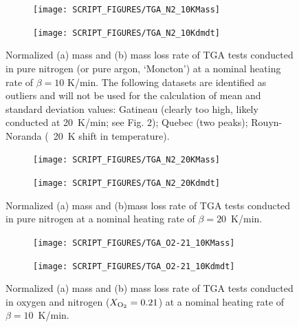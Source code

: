 \documentclass{book}
\begin{document}
\begin{figure} [p]
\centering
\begin{subfigure}[b]{0.85\textwidth}
   \texttt{[image: SCRIPT\_FIGURES/TGA\_N2\_10KMass]}
   \caption{}
   \label{Fig:TGA_N2_10KMass}
\end{subfigure}

\begin{subfigure}[b]{0.85\textwidth}
   \texttt{[image: SCRIPT\_FIGURES/TGA\_N2\_10Kdmdt]}
   \caption{}
   \label{Fig:TGA_N2_10Kdmdt}
\end{subfigure}

  \caption{Normalized (a) mass and (b) mass loss rate of TGA tests conducted in pure nitrogen (or pure argon, ‘Moncton’) at a nominal heating rate of $\beta = 10$ K/min. The following datasets are identified as outliers and will not be used for the calculation of mean and standard deviation values: Gatineau (clearly too high, likely conducted at 20~K/min; see Fig. 2); Quebec (two peaks); Rouyn-Noranda (~20~K shift in temperature).}
  \label{Fig:TGA_N2_10K}
\end{figure}

\begin{figure}[p]
\centering
\begin{subfigure}[b]{0.85\textwidth}
   \texttt{[image: SCRIPT\_FIGURES/TGA\_N2\_20KMass]}
   \caption{}
   \label{Fig:TGA_N2_20KMass}
\end{subfigure}

\begin{subfigure}[b]{0.85\textwidth}
   \texttt{[image: SCRIPT\_FIGURES/TGA\_N2\_20Kdmdt]}
   \caption{}
   \label{Fig:TGA_N2_20Kdmdt}
\end{subfigure}

  \caption{Normalized (a) mass and (b)mass loss rate of TGA tests conducted in pure nitrogen at a nominal heating rate of $\beta=20$~K/min.}
  \label{Fig:TGA_N2_20K}
\end{figure}


\begin{figure}
\centering
\begin{subfigure}[b]{0.85\textwidth}
   \texttt{[image: SCRIPT\_FIGURES/TGA\_O2-21\_10KMass]}
   \caption{}
   \label{Fig:TGA_O2-21_10KMass}
\end{subfigure}

\begin{subfigure}[b]{0.85\textwidth}
   \texttt{[image: SCRIPT\_FIGURES/TGA\_O2-21\_10Kdmdt]}
   \caption{}
   \label{Fig:TGA_O2-21_10Kdmdt}
\end{subfigure}

  \caption{Normalized (a) mass and (b) mass loss rate of TGA tests conducted in oxygen and nitrogen ($X_{\rm O_2}=0.21$) at a nominal heating rate of $\beta=10$~K/min.}
  \label{Fig:TGA_O2-21_10K}
\end{figure}
\end{document}
